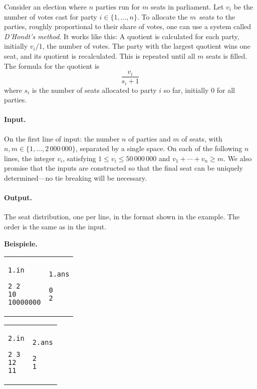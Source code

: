 \documentclass{uebung_cs}
\begin{document}
Consider an election where $n$ parties run for $m$ seats in parliament.
Let $v_i$ be the number of votes cast for party $i\in\{1,\ldots,n\}$.
To allocate the $m$~seats to the parties, roughly proportional to their share of votes, one can use a system called \emph{D'Hondt's method}.
It works like this:
A quotient is calculated for each party, initially $v_i/1$, the number of votes.
The party with the largest quotient wins one seat, and its quotient is recalculated.
This is repeated until all $m$ seats is filled.
The formula for the quotient is
\[\frac{v_i}{s_i+1}\]
where $s_i$ is the number of seats allocated to party $i$ so far, initially $0$ for all parties.

\paragraph{Input.}
On the first line of input: the number $n$ of parties and $m$ of seats, with $n,m\in\{1 ,\ldots, 2\,000\,000\}$, separated by a single space.
On each of the following $n$ lines, the integer $v_i$, satisfying $1\leq v_i\leq 50\,000\,000$  and $v_1+\cdots +v_n\geq m$.
We also promise that the inputs are constructed so that the final seat can be uniquely determined---no tie breaking will be necessary.

\paragraph{Output.}
The seat distribution, one per line, in the format shown in the example.
The order is the same as in the input.

\textbf{Beispiele.}\\
\begin{tabular}{p{}p{}}
\texttt{1.in}
\begin{verbatim}
2 2
10
10000000
\end{verbatim}
&
\texttt{1.ans}
\begin{verbatim}
0
2
\end{verbatim}
\end{tabular}

\begin{tabular}{p{}p{}}
\texttt{2.in}
\begin{verbatim}
2 3
12
11
\end{verbatim}
&
\texttt{2.ans}
\begin{verbatim}
2
1
\end{verbatim}
\end{tabular}
\end{document}
